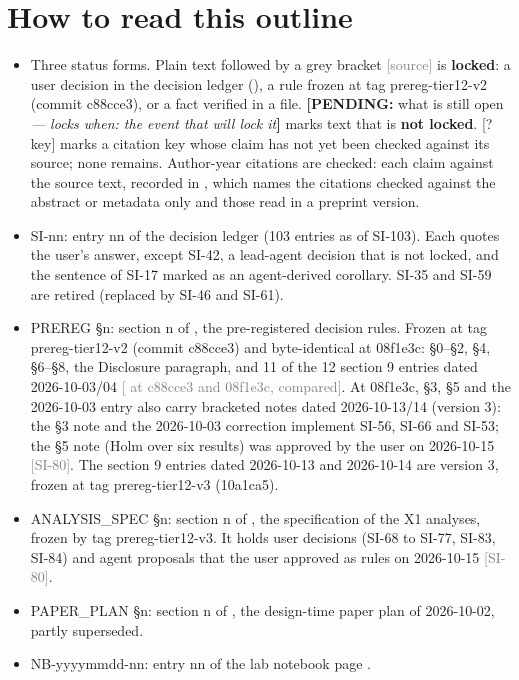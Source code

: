 \documentclass[11pt]{article}
\newcommand{\src}[1]{{\scriptsize\textcolor{gray}{[#1]}}}
\newcommand{\pending}[2]{{\color{BurntOrange}\textbf{[PENDING:} #1 \textit{--- locks when: #2}\textbf{]}}}
\newcommand{\unverified}[1]{{\color{red}[?#1]}}
\begin{document}
\section*{How to read this outline}
\begin{itemize}
\item Three status forms. Plain text followed by a grey bracket \src{source} is \textbf{locked}: a user decision in the decision ledger (), a rule frozen at tag prereg-tier12-v2 (commit c88cce3), or a fact verified in a file. \pending{what is still open}{the event that will lock it} marks text that is \textbf{not locked}. \unverified{key} marks a citation key whose claim has not yet been checked against its source; none remains. Author-year citations are checked: each claim against the source text, recorded in , which names the citations checked against the abstract or metadata only and those read in a preprint version.
\item SI-nn: entry nn of the decision ledger  (103 entries as of SI-103). Each quotes the user's answer, except SI-42, a lead-agent decision that is not locked, and the sentence of SI-17 marked as an agent-derived corollary. SI-35 and SI-59 are retired (replaced by SI-46 and SI-61).
\item PREREG \S n: section n of , the pre-registered decision rules. Frozen at tag prereg-tier12-v2 (commit c88cce3) and byte-identical at 08f1e3c: \S0--\S2, \S4, \S6--\S8, the Disclosure paragraph, and 11 of the 12 section 9 entries dated 2026-10-03/04 \src{ at c88cce3 and 08f1e3c, compared}. At 08f1e3c, \S3, \S5 and the 2026-10-03 entry also carry bracketed notes dated 2026-10-13/14 (version 3): the \S3 note and the 2026-10-03 correction implement SI-56, SI-66 and SI-53; the \S5 note (Holm over six results) was approved by the user on 2026-10-15 \src{SI-80}. The section 9 entries dated 2026-10-13 and 2026-10-14 are version 3, frozen at tag prereg-tier12-v3 (10a1ca5).
\item ANALYSIS\_SPEC \S n: section n of , the specification of the X1 analyses, frozen by tag prereg-tier12-v3. It holds user decisions (SI-68 to SI-77, SI-83, SI-84) and agent proposals that the user approved as rules on 2026-10-15 \src{SI-80}.
\item PAPER\_PLAN \S n: section n of , the design-time paper plan of 2026-10-02, partly superseded.
\item NB-yyyymmdd-nn: entry nn of the lab notebook page .

\end{itemize}
\end{document}
